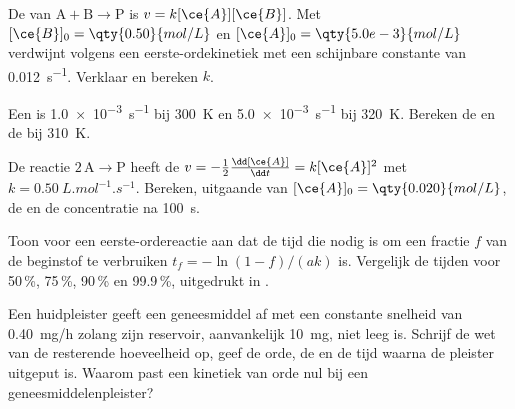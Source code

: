 \begin{exercise}[$\star\star$]\label{exo:b1:rate-laws:7}
De  van $\mathrm{A} + \mathrm{B} \longrightarrow \mathrm{P}$ is $v = k[\ce{A}][\ce{B}]$. Met
$[\ce{B}]_0 = \qty{0.50}{mol/L}$ en $[\ce{A}]_0 = \qty{5.0e-3}{mol/L}$
verdwijnt  volgens een eerste-ordekinetiek met een schijnbare
constante van \qty{0.012}{s^{-1}}. Verklaar en bereken $k$.
\end{exercise}

\begin{exercise}[$\star\star$]\label{exo:b1:rate-laws:8}
Een  is \qty{1.0e-3}{s^{-1}} bij \qty{300}{K} en
\qty{5.0e-3}{s^{-1}} bij \qty{320}{K}. Bereken de  en
de  bij \qty{310}{K}.
\end{exercise}

\begin{exercise}[$\star\star$]\label{exo:b1:rate-laws:9}
De reactie $2\,\mathrm{A} \longrightarrow \mathrm{P}$ heeft de  $v = -\frac12\frac{\dd[\ce{A}]}
{\dd t} = k[\ce{A}]^2$ met $k = \qty{0.50}{L.mol^{-1}.s^{-1}}$. Bereken,
uitgaande van $[\ce{A}]_0 = \qty{0.020}{mol/L}$, de  en de
concentratie na \qty{100}{s}.
\end{exercise}

\begin{exercise}[$\star\star\star$]\label{exo:b1:rate-laws:10}
Toon voor een eerste-ordereactie aan dat de tijd die nodig is om een
fractie $f$ van de beginstof te verbruiken $t_f = -\ln(1 - f)/(ak)$ is.
Vergelijk de tijden voor 50\,\%, 75\,\%, 90\,\% en 99.9\,\%, uitgedrukt
in .
\end{exercise}

\begin{exercise}[$\star\star\star$]\label{exo:b1:rate-laws:11}
Een huidpleister geeft een geneesmiddel af met een constante snelheid van
\qty{0.40}{mg/h} zolang zijn reservoir, aanvankelijk \qty{10}{mg}, niet
leeg is. Schrijf de wet van de resterende hoeveelheid op, geef de orde,
de  en de tijd waarna de pleister uitgeput is. Waarom past
een kinetiek van orde nul bij een geneesmiddelenpleister?
\end{exercise}

